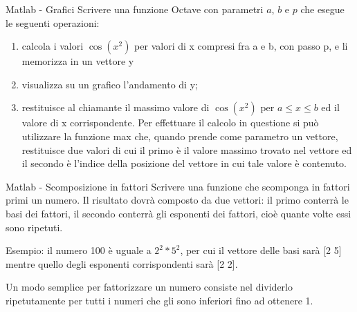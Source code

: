 \begin{frame}{Matlab - Grafici}
    Scrivere una funzione Octave con parametri $a$, $b$ e $p$ che esegue le seguenti operazioni:
    \begin{enumerate}
        \item  calcola i valori $\cos(x^2)$ per valori di x compresi fra a e b, con passo p, e li memorizza in un vettore y
        \item visualizza su un grafico l'andamento di y;
        \item restituisce al chiamante il massimo valore di $\cos(x^2)$ per $a \leq x \leq b$ ed il valore di x corrispondente. Per effettuare il
            calcolo in questione si può utilizzare la funzione max che, quando prende come parametro un vettore, restituisce due
            valori di cui il primo è il valore massimo trovato nel vettore ed il secondo è l’indice della posizione del vettore in cui tale
            valore è contenuto.
    \end{enumerate}
\end{frame}


\begin{frame}{Matlab - Scomposizione in fattori}
    Scrivere una funzione che scomponga in fattori primi un numero.
    Il risultato dovrà composto da due vettori: il primo conterrà le basi dei fattori, il secondo conterrà gli esponenti dei fattori, cioè quante volte essi sono ripetuti.

    Esempio: il numero 100 è uguale a $2^2 * 5^2$, per cui il vettore delle basi sarà [2 5] mentre quello degli esponenti corrispondenti sarà [2 2].

    Un modo semplice per fattorizzare un numero consiste nel dividerlo ripetutamente per tutti i numeri che gli sono inferiori fino ad ottenere 1.
\end{frame}
\fi
